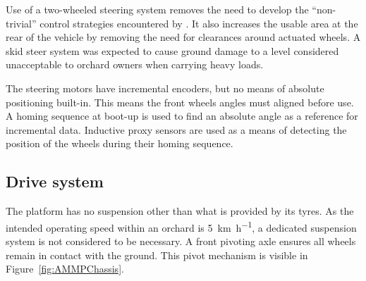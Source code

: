 \documentclass[preprint,authoryear,12pt]{elsarticle}
\begin{document}
        Use of a two-wheeled steering system removes the need to develop the ``non-trivial'' control strategies encountered by \cite{Bak2004}.
        It also increases the usable area at the rear of the vehicle by removing the need for clearances around actuated wheels.
        A skid steer system was expected to cause ground damage to a level considered unacceptable to orchard owners when carrying heavy loads.

        The steering motors have incremental encoders, but no means of absolute positioning built-in.
        This means the front wheels angles must aligned before use.
        A homing sequence at boot-up is used to find an absolute angle as a reference for incremental data.
        Inductive proxy sensors are used as a means of detecting the position of the wheels during their homing sequence.

    \subsection{Drive system}
    \label{sub:drive}

        The platform has no suspension other than what is provided by its tyres.
        As the intended operating speed within an orchard is \SI{5}{\kilo\meter\per\hour}, a dedicated suspension system is not considered to be necessary.
        A front pivoting axle ensures all wheels remain in contact with the ground.
        This pivot mechanism is visible in Figure~\ref{fig:AMMPChassis}.
\end{document}
